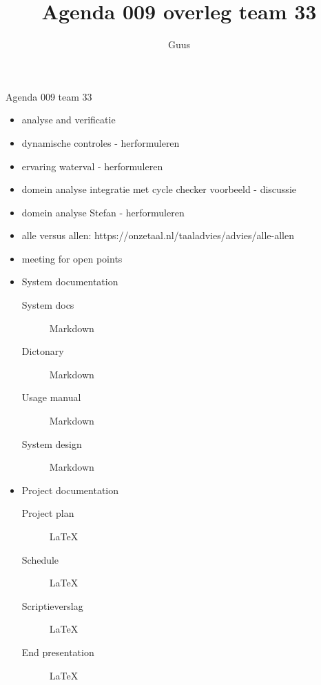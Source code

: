 \documentclass{article}
\title{Agenda 009 overleg team 33}
\author{Guus}
\begin{document}

\newcommand{\latex}{\LaTeX}

\begin{Minutes}{Agenda 009 team 33}

\maketitle%

\begin{itemize}
    \item analyse and verificatie
    \item dynamische controles - herformuleren
    \item ervaring waterval - herformuleren
    \item domein analyse integratie met cycle checker voorbeeld - discussie
    \item domein analyse Stefan - herformuleren
    \item alle versus allen: https://onzetaal.nl/taaladvies/advies/alle-allen
    \item meeting for open points
\end{itemize}

\begin{itemize}
    \item System documentation
    \begin{description}
        \item[System docs] Markdown
        \item[Dictonary] Markdown
        \item[Usage manual] Markdown
        \item[System design] Markdown
    \end{description}
    \item Project documentation
    \begin{description}
        \item[Project plan] \latex
        \item[Schedule] \latex
        \item[Scriptieverslag] \latex
        \item[End presentation] \latex
    \end{description}

\end{itemize}


\end{Minutes}
\end{document}
